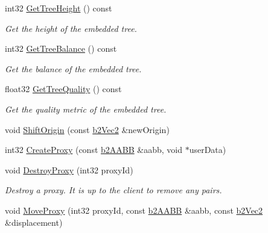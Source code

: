 \begin{DoxyCompactItemize}
int32 \hyperlink{classb2BroadPhase_a868f95225d62c3ea79d231ed305253ea}{Get\+Tree\+Height} () const
\begin{DoxyCompactList}\small\item\em Get the height of the embedded tree. \end{DoxyCompactList}\item 
\mbox{\label{classb2BroadPhase_a29612faf9f0191827440178629d5e887}} 
int32 \hyperlink{classb2BroadPhase_a29612faf9f0191827440178629d5e887}{Get\+Tree\+Balance} () const
\begin{DoxyCompactList}\small\item\em Get the balance of the embedded tree. \end{DoxyCompactList}\item 
\mbox{\label{classb2BroadPhase_a4e7d2f5d16ac100b18511e6a42e758bf}} 
float32 \hyperlink{classb2BroadPhase_a4e7d2f5d16ac100b18511e6a42e758bf}{Get\+Tree\+Quality} () const
\begin{DoxyCompactList}\small\item\em Get the quality metric of the embedded tree. \end{DoxyCompactList}\item 
void \hyperlink{classb2BroadPhase_a410e6115e3d1b4fca61cfbf397767772}{Shift\+Origin} (const \hyperlink{structb2Vec2}{b2\+Vec2} \&new\+Origin)
\item 
int32 \hyperlink{classb2BroadPhase_ae2f7af756bc55ece45221466c5af449c}{Create\+Proxy} (const \hyperlink{structb2AABB}{b2\+A\+A\+BB} \&aabb, void $\ast$user\+Data)
\item 
\mbox{\label{classb2BroadPhase_a84f0fb227dc01a9b9baa55c7b8c68984}} 
void \hyperlink{classb2BroadPhase_a84f0fb227dc01a9b9baa55c7b8c68984}{Destroy\+Proxy} (int32 proxy\+Id)
\begin{DoxyCompactList}\small\item\em Destroy a proxy. It is up to the client to remove any pairs. \end{DoxyCompactList}\item 
void \hyperlink{classb2BroadPhase_a01dc18a19c2b5d0cc1d9cd8c8554234c}{Move\+Proxy} (int32 proxy\+Id, const \hyperlink{structb2AABB}{b2\+A\+A\+BB} \&aabb, const \hyperlink{structb2Vec2}{b2\+Vec2} \&displacement)
\item 
\mbox{\label{classb2BroadPhase_a67b296431ebbc7b44037f21d645d9166}} 

\end{DoxyCompactItemize}
